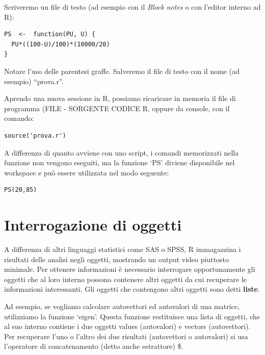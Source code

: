 \documentclass[a4paper,12pt,oneside]{book}
\begin{document}
Scriveremo un file di testo (ad esempio con il \emph{Block notes} o con l'editor interno ad R):

\begin{verbatim}
PS  <-  function(PU, U) {
  PU*((100-U)/100)*(10000/20)
}
\end{verbatim}

Notare l'uso delle parentesi graffe. Salveremo il file di testo con il nome (ad esempio) ``prova.r''.

Aprendo una nuova sessione in R, possiamo ricaricare in memoria il file di programma (FILE - SORGENTE CODICE R, oppure da console, con il comando:

\begin{verbatim}
source('prova.r')
\end{verbatim}

A differenza di quanto avviene con uno script, i comandi memorizzati nella funzione non vengono eseguiti, ma la funzione `PS' diviene disponibile nel workspace e può essere utilizzata nel modo seguente:

\begin{verbatim}
PS(20,85)
\end{verbatim}

\hypertarget{interrogazione-di-oggetti}{%
\section*{Interrogazione di oggetti}\label{interrogazione-di-oggetti}}

A differenza di altri linguaggi statistici come SAS o SPSS, R immagazzina i risultati delle analisi negli oggetti, mostrando un output video piuttosto minimale. Per ottenere informazioni è necessario interrogare opportunamente gli oggetti che al loro interno possono contenere altri oggetti da cui recuperare le informazioni interessanti. Gli oggetti che contengono altri oggetti sono detti
\textbf{liste}.

Ad esempio, se vogliamo calcolare autovettori ed autovalori di una
matrice, utilizziamo la funzione `eigen'. Questa funzione restituisce una lista di oggetti, che al suo interno contiene i due oggetti values (autovalori) e vectors (autovettori). Per recuperare l'uno o l'altro dei due risultati (autovettori o autovalori) si usa l'operatore di concatenamento (detto anche estrattore) \$.
\end{document}
